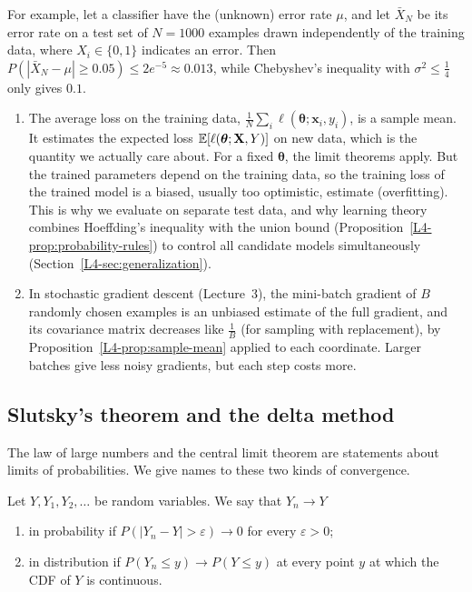 For example, let a classifier have the (unknown) error rate $\mu$, and let $\bar X_N$ be its error rate on a test set of $N = 1000$ examples drawn independently of the training data, where $X_i \in \{0, 1\}$ indicates an error. Then $P(|\bar X_N - \mu| \geq 0.05) \leq 2e^{-5} \approx 0.013$, while Chebyshev's inequality with $\sigma^2 \leq \frac{1}{4}$ only gives $0.1$.

\begin{remark}
    \begin{enumerate}
        \item The average loss on the training data, $\frac{1}{N}\sum_i \ell(\boldsymbol{\theta}; \mathbf{x}_i, y_i)$, is a sample mean. It estimates the expected loss $\mathbb{E}[\ell(\boldsymbol{\theta}; \mathbf{X}, Y)]$ on new data, which is the quantity we actually care about. For a fixed $\boldsymbol{\theta}$, the limit theorems apply. But the trained parameters depend on the training data, so the training loss of the trained model is a biased, usually too optimistic, estimate (overfitting). This is why we evaluate on separate test data, and why learning theory combines Hoeffding's inequality with the union bound (Proposition~\ref{L4-prop:probability-rules}) to control all candidate models simultaneously (Section~\ref{L4-sec:generalization}).
        \item In stochastic gradient descent (Lecture~3), the mini-batch gradient of $B$ randomly chosen examples is an unbiased estimate of the full gradient, and its covariance matrix decreases like $\frac{1}{B}$ (for sampling with replacement), by Proposition~\ref{L4-prop:sample-mean} applied to each coordinate. Larger batches give less noisy gradients, but each step costs more.
    \end{enumerate}
\end{remark}

\subsection{Slutsky's theorem and the delta method}\label{L4-sec:delta-method}

The law of large numbers and the central limit theorem are statements about limits of probabilities. We give names to these two kinds of convergence.

\begin{definition}\label{L4-def:convergence}
    Let $Y, Y_1, Y_2, \ldots$ be random variables. We say that $Y_n \to Y$
    \begin{enumerate}
        \item in probability if $P(|Y_n - Y| > \varepsilon) \to 0$ for every $\varepsilon > 0$;
        \item in distribution if $P(Y_n \leq y) \to P(Y \leq y)$ at every point $y$ at which the CDF of $Y$ is continuous.
    \end{enumerate}
\end{definition}

